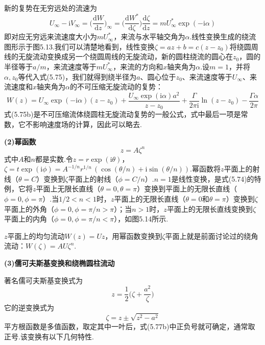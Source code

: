 新的复势在无穷远处的流速为
\[
U_\infty-\mathrm{i}V_\infty=\Big(\frac{\mathrm{d}W}{\mathrm{d}z}\Big)_\infty=\Big(\frac{\mathrm{d}W^{*}}{\mathrm{d}\zeta}\Big)\frac{\mathrm{d}\zeta}{\mathrm{d}z}=mU_\infty^{*}\exp(-\mathrm{i}\alpha)
\]
即对应无穷远来流速度大小为$mU_\infty^{*}$，来流与水平轴交角为$\alpha$.线性变换生成的绕流图形示于图5.13.我们可以清楚地看到，线性变换$\zeta=az+b=c(z-z_0)$将绕圆周线的无旋流动变换成另一个绕圆周线的无旋流动，新的圆柱绕流的圆心在$z_0$，圆的半径等于$a/m$，来流速度等于$mU_\infty^{*}$，来流的方向和$x$轴夹角为$\alpha$.设$m=1$，并将$\alpha,z_0$等代入式(5.75)，我们就得到绕半径为$a$、圆心位于$z_0$、来流速度等于$U_\infty$、来流速度和$x$轴夹角为$\alpha$的不可压缩无旋流动的复势：
\begin{equation*}
W(z)=U_\infty\exp(-\mathrm{i}\alpha)(z-z_0)+\frac{U_\infty\exp(\mathrm{i}\alpha)a^{2}}{z-z_0}+\frac{\Gamma}{2\pi\mathrm{i}}\ln(z-z_0)-\frac{\Gamma\alpha}{2\pi}
\tag{5.75b}
\end{equation*}
式(5.75b)是不可压缩流体绕圆柱无旋流动复势的一般公式，式中最后一项是常数，它不影响速度场的计算，因此可以略去.

\textbf{(2)幂函数}
\begin{equation*}
z=A\zeta^{n}
\tag{5.76}
\end{equation*}
式中$A$和$n$都是实数.令$z=r\exp(\mathrm{i}\theta)$，$\zeta=t\exp(\mathrm{i}\phi)=A^{-1/n}r^{1/n}\,(\cos(\theta/n)+\mathrm{i}\sin(\theta/n))$.幂函数将$z$平面上的射线（$\theta=C$）变换到$\zeta$平面上的射线（$\phi=C/n$）.$n=1$是线性变换，是式(5.74)的特例，它将$z$平面上无限长直线（$\theta=0,\theta=\pi$）变换到平面上的无限长直线（$\phi=0,\phi=\pi$）.当$1/2<n<1$时，$z$平面上的无限长直线（$\theta=0$和$\theta=\pi$）变换到$\zeta$平面上的外角（$\phi=0,\phi=\pi/n>\pi$）；当$n>1$时，$z$平面上的无限长直线变换到$\zeta$平面上的内角（$\phi=0,\phi=\pi/n<\pi$），如图5.14所示.

$z$平面上的均匀流动$W(z)=Uz$，用幂函数变换到$\zeta$平面上就是前面讨论过的绕角流动：$W(\zeta)=AU\zeta^{n}$.

\textbf{(3)儒可夫斯基变换和绕椭圆柱流动}

著名儒可夫斯基变换式为
\begin{equation*}
z=\frac{1}{2}\Big(\zeta+\frac{a^{2}}{\zeta}\Big)
\tag{5.77a}
\end{equation*}
它的逆变换式为
\begin{equation*}
\zeta=z\pm\sqrt{z^{2}-a^{2}}
\tag{5.77b}
\end{equation*}
平方根函数是多值函数，取定其中一叶后，式(5.77b)中正负号就可确定，通常取正号.该变换有以下几何特性.

